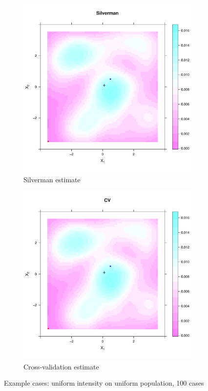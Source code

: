\begin{figure}[htbp]
    \begin{subfigure}[b]{0.45\textwidth}
    \includegraphics[width=\textwidth]{results/unif_100_unif/output/silverman_intensity_heatmap}
    \caption{Silverman estimate}
    \end{subfigure}%
    \begin{subfigure}[b]{0.45\textwidth}
    \includegraphics[width=\textwidth]{results/unif_100_unif/output/CV_intensity_heatmap}
    \caption{Cross-validation estimate}
    \end{subfigure}
    \label{fig:cases:unif_100_unif}
    \caption{Example cases: uniform intensity on uniform population, 100 cases}
\end{figure}

